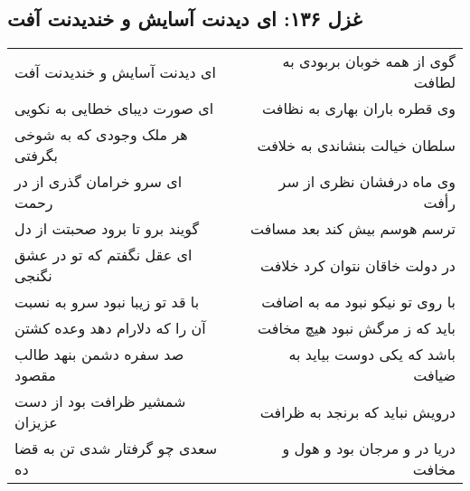 \begin{center}
\section*{غزل ۱۳۶: ای دیدنت آسایش و خندیدنت آفت}
\label{sec:136}
\begin{longtable}{l p{0.5cm} r}
ای دیدنت آسایش و خندیدنت آفت
&&
گوی از همه خوبان بربودی به لطافت
\\
ای صورت دیبای خطایی به نکویی
&&
وی قطره باران بهاری به نظافت
\\
هر ملک وجودی که به شوخی بگرفتی
&&
سلطان خیالت بنشاندی به خلافت
\\
ای سرو خرامان گذری از در رحمت
&&
وی ماه درفشان نظری از سر رأفت
\\
گویند برو تا برود صحبتت از دل
&&
ترسم هوسم بیش کند بعد مسافت
\\
ای عقل نگفتم که تو در عشق نگنجی
&&
در دولت خاقان نتوان کرد خلافت
\\
با قد تو زیبا نبود سرو به نسبت
&&
با روی تو نیکو نبود مه به اضافت
\\
آن را که دلارام دهد وعده کشتن
&&
باید که ز مرگش نبود هیچ مخافت
\\
صد سفره دشمن بنهد طالب مقصود
&&
باشد که یکی دوست بیاید به ضیافت
\\
شمشیر ظرافت بود از دست عزیزان
&&
درویش نباید که برنجد به ظرافت
\\
سعدی چو گرفتار شدی تن به قضا ده
&&
دریا در و مرجان بود و هول و مخافت
\\
\end{longtable}
\end{center}

